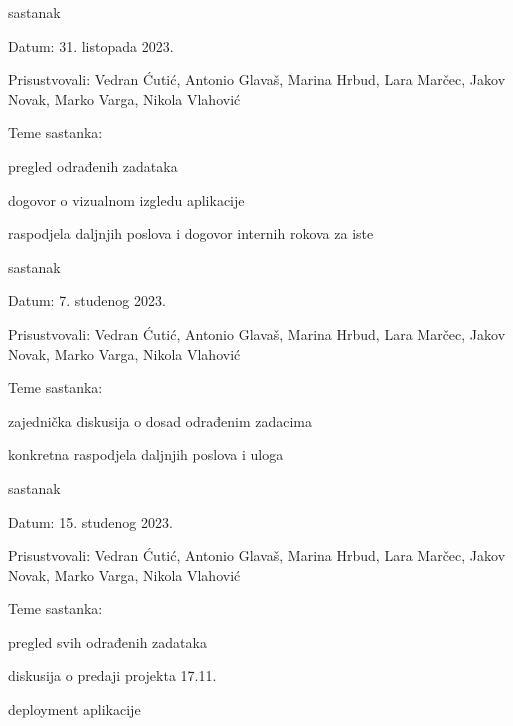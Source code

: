 \begin{packed_enum}
			\item  sastanak
			\item[] \begin{packed_item}
				\item Datum: 31. listopada 2023.
				\item Prisustvovali: Vedran Ćutić, Antonio Glavaš, Marina Hrbud, Lara Marčec, Jakov Novak, Marko Varga, Nikola Vlahović
				\item Teme sastanka:
				\begin{packed_item}
					\item  pregled odrađenih zadataka
					\item  dogovor o vizualnom izgledu aplikacije
					\item  raspodjela daljnjih poslova i dogovor internih rokova za iste
				\end{packed_item}
			\end{packed_item}
			
			\item  sastanak
			\item[] \begin{packed_item}
				\item Datum: 7. studenog 2023.
				\item Prisustvovali: Vedran Ćutić, Antonio Glavaš, Marina Hrbud, Lara Marčec, Jakov Novak, Marko Varga, Nikola Vlahović
				\item Teme sastanka:
				\begin{packed_item}
					\item  zajednička diskusija o dosad odrađenim zadacima
					\item  konkretna raspodjela daljnjih poslova i uloga
				\end{packed_item}
			\end{packed_item}


   			\item  sastanak
			\item[] \begin{packed_item}
				\item Datum: 15. studenog 2023.
				\item Prisustvovali: Vedran Ćutić, Antonio Glavaš, Marina Hrbud, Lara Marčec, Jakov Novak, Marko Varga, Nikola Vlahović
				\item Teme sastanka:
				\begin{packed_item}
					\item  pregled svih odrađenih zadataka
					\item  diskusija o predaji projekta 17.11.
     					\item  deployment aplikacije
				\end{packed_item}
			\end{packed_item}
			
			
		\end{packed_enum}
		
